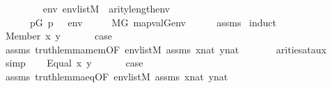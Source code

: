 \begin{isabellebody}
\ \ \ \isanewline
\ \ \ \ \ {\isachardoublequoteopen}{\isasymAnd}env{\isachardot}{\kern0pt}\ env{\isasymin}list{\isacharparenleft}{\kern0pt}M{\isacharparenright}{\kern0pt}\ {\isasymLongrightarrow}\ arity{\isacharparenleft}{\kern0pt}{\isasymphi}{\isacharparenright}{\kern0pt}{\isasymle}length{\isacharparenleft}{\kern0pt}env{\isacharparenright}{\kern0pt}\ {\isasymLongrightarrow}\ \isanewline
\ \ \ \ \ \ {\isacharparenleft}{\kern0pt}{\isasymexists}p{\isasymin}G{\isachardot}{\kern0pt}\ p\ {\isasymtturnstile}\ {\isasymphi}\ env{\isacharparenright}{\kern0pt}\ \ \ {\isasymlongleftrightarrow}\ \ \ M{\isacharbrackleft}{\kern0pt}G{\isacharbrackright}{\kern0pt}{\isacharcomma}{\kern0pt}\ map{\isacharparenleft}{\kern0pt}val{\isacharparenleft}{\kern0pt}G{\isacharparenright}{\kern0pt}{\isacharcomma}{\kern0pt}env{\isacharparenright}{\kern0pt}\ {\isasymTurnstile}\ {\isasymphi}{\isachardoublequoteclose}\isanewline
%
\isadelimproof
\ \ %
\endisadelimproof
%
\isatagproof
{}\isamarkupfalse%
\ assms{\isacharparenleft}{\kern0pt}{}{\isacharparenright}{\kern0pt}\isanewline
{}\isamarkupfalse%
\ {\isacharparenleft}{\kern0pt}induct{\isacharparenright}{\kern0pt}\isanewline
\ \ \isamarkupfalse%
\ {\isacharparenleft}{\kern0pt}Member\ x\ y{\isacharparenright}{\kern0pt}\isanewline
\ \ \isamarkupfalse%
\isanewline
\ \ \isamarkupfalse%
\ {\isacharquery}{\kern0pt}case\isanewline
\ \ \ \ \isamarkupfalse%
\ assms\ truth{\isacharunderscore}{\kern0pt}lemma{\isacharunderscore}{\kern0pt}mem{\isacharbrackleft}{\kern0pt}OF\ {\isacartoucheopen}env{\isasymin}list{\isacharparenleft}{\kern0pt}M{\isacharparenright}{\kern0pt}{\isacartoucheclose}\ assms{\isacharparenleft}{\kern0pt}{}{\isacharparenright}{\kern0pt}\ {\isacartoucheopen}x{\isasymin}nat{\isacartoucheclose}\ {\isacartoucheopen}y{\isasymin}nat{\isacartoucheclose}{\isacharbrackright}{\kern0pt}\ \isanewline
\ \ \ \ \ \ arities{\isacharunderscore}{\kern0pt}at{\isacharunderscore}{\kern0pt}aux\ \isamarkupfalse%
\ simp\isanewline
{}\isamarkupfalse%
\isanewline
\ \ \isamarkupfalse%
\ {\isacharparenleft}{\kern0pt}Equal\ x\ y{\isacharparenright}{\kern0pt}\isanewline
\ \ \isamarkupfalse%
\isanewline
\ \ \isamarkupfalse%
\ {\isacharquery}{\kern0pt}case\isanewline
\ \ \ \ \isamarkupfalse%
\ assms\ truth{\isacharunderscore}{\kern0pt}lemma{\isacharunderscore}{\kern0pt}eq{\isacharbrackleft}{\kern0pt}OF\ {\isacartoucheopen}env{\isasymin}list{\isacharparenleft}{\kern0pt}M{\isacharparenright}{\kern0pt}{\isacartoucheclose}\ assms{\isacharparenleft}{\kern0pt}{}{\isacharparenright}{\kern0pt}\ {\isacartoucheopen}x{\isasymin}nat{\isacartoucheclose}\ {\isacartoucheopen}y{\isasymin}nat{\isacartoucheclose}{\isacharbrackright}{\kern0pt}\ \isanewline

\end{isabellebody}
